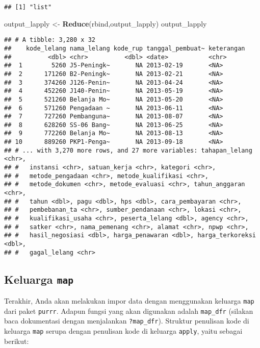 \documentclass[]{article}
\newenvironment{Shaded}{\begin{snugshade}}{\end{snugshade}}
\newcommand{\KeywordTok}[1]{\textcolor[rgb]{0.13,0.29,0.53}{\textbf{#1}}}
\newcommand{\NormalTok}[1]{#1}
\newcommand{\StringTok}[1]{\textcolor[rgb]{0.31,0.60,0.02}{#1}}
\begin{document}
\begin{verbatim}
## [1] "list"
\end{verbatim}

\begin{Shaded}
\begin{Highlighting}[]
\NormalTok{output_lapply <-}\StringTok{ }\KeywordTok{Reduce}\NormalTok{(rbind,output_lapply)}
\NormalTok{output_lapply}
\end{Highlighting}
\end{Shaded}

\begin{verbatim}
## # A tibble: 3,280 x 32
##    kode_lelang nama_lelang kode_rup tanggal_pembuat~ keterangan
##          <dbl> <chr>          <dbl> <date>           <chr>     
##  1        5260 J5-Peningk~       NA 2013-02-19       <NA>      
##  2      171260 B2-Peningk~       NA 2013-02-21       <NA>      
##  3      374260 J126-Penin~       NA 2013-04-24       <NA>      
##  4      452260 J140-Penin~       NA 2013-05-19       <NA>      
##  5      521260 Belanja Mo~       NA 2013-05-20       <NA>      
##  6      571260 Pengadaan ~       NA 2013-06-11       <NA>      
##  7      727260 Pembanguna~       NA 2013-08-07       <NA>      
##  8      628260 SS-06 Bang~       NA 2013-06-25       <NA>      
##  9      772260 Belanja Mo~       NA 2013-08-13       <NA>      
## 10      889260 PKP1-Penga~       NA 2013-09-18       <NA>      
## # ... with 3,270 more rows, and 27 more variables: tahapan_lelang <chr>,
## #   instansi <chr>, satuan_kerja <chr>, kategori <chr>,
## #   metode_pengadaan <chr>, metode_kualifikasi <chr>,
## #   metode_dokumen <chr>, metode_evaluasi <chr>, tahun_anggaran <chr>,
## #   tahun <dbl>, pagu <dbl>, hps <dbl>, cara_pembayaran <chr>,
## #   pembebanan_ta <chr>, sumber_pendanaan <chr>, lokasi <chr>,
## #   kualifikasi_usaha <chr>, peserta_lelang <dbl>, agency <chr>,
## #   satker <chr>, nama_pemenang <chr>, alamat <chr>, npwp <chr>,
## #   hasil_negosiasi <dbl>, harga_penawaran <dbl>, harga_terkoreksi <dbl>,
## #   gagal_lelang <chr>
\end{verbatim}

\hypertarget{keluarga-map}{%
\subsection{\texorpdfstring{Keluarga
\texttt{map}}{Keluarga map}}\label{keluarga-map}}

Terakhir, Anda akan melakukan impor data dengan menggunakan keluarga
\texttt{map} dari paket \texttt{purrr}. Adapun fungsi yang akan
digunakan adalah \texttt{map\_dfr} (silakan baca dokumentasi dengan
menjalankan \texttt{?map\_dfr}). Struktur penulisan kode di keluarga
\texttt{map} serupa dengan penulisan kode di keluarga \texttt{apply},
yaitu sebagai berikut:
\end{document}

